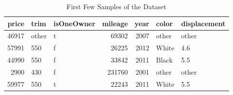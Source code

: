 \begin{table}[ht]
\centering
\begin{tabular}{rllrrll}
  \hline
price & trim & isOneOwner & mileage & year & color & displacement \\ 
  \hline
46917 & other & t & 69302 & 2007 & other & other \\ 
  57991 & 550 & f & 26225 & 2012 & White & 4.6 \\ 
  44990 & 550 & f & 33842 & 2011 & Black & 5.5 \\ 
  2900 & 430 & f & 231760 & 2001 & other & other \\ 
  59977 & 550 & t & 22243 & 2011 & White & 5.5 \\ 
   \hline
\end{tabular}
\caption{First Few Samples of the Dataset} 
\label{tab:head_dat}
\end{table}
